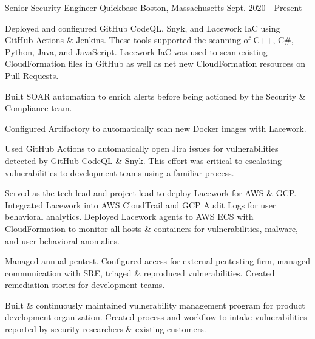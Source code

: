 

\begin{cventries}
\vspace{-3mm}
  \cventry
    {Senior Security Engineer} %
    {Quickbase} %
    {Boston, Massachusetts} %
    {Sept. 2020 - Present} %
    {
      \begin{cvitems} %
        \item {
          Deployed and configured GitHub CodeQL, Snyk, and Lacework IaC using GitHub Actions \& Jenkins. These tools supported the scanning of C++, C\#, Python, Java, and JavaScript. Lacework IaC was used to scan existing CloudFormation files in GitHub as well as net new CloudFormation resources on Pull Requests.
        }
        \item {
          Built SOAR automation to enrich alerts before being actioned by the Security \& Compliance team.
        }
        \item {
          Configured Artifactory to automatically scan new Docker images with Lacework.
        }
        \item {
          Used GitHub Actions to automatically open Jira issues for vulnerabilities detected by GitHub CodeQL \& Snyk. This effort was critical to escalating vulnerabilities to development teams using a familiar process.
        }
        \item {
          Served as the tech lead and project lead to deploy Lacework for AWS \& GCP. Integrated Lacework into AWS CloudTrail and GCP Audit Logs for user behavioral analytics. Deployed Lacework agents to AWS ECS with CloudFormation to monitor all hosts \& containers for vulnerabilities, malware, and user behavioral anomalies.
        }
        \item {
          Managed annual pentest. Configured access for external pentesting firm, managed communication with SRE, triaged \& reproduced vulnerabilities. Created remediation stories for development teams.
        }
        \item {
          Built \& continuously maintained vulnerability management program for product development organization. Created process and workflow to intake vulnerabilities reported by security researchers \& existing customers.
}
\end{cvitems}}
\end{cventries}
